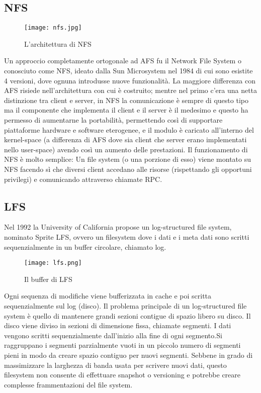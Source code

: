 \subsection{NFS}
\begin{figure}[ht]
  \begin{center}
    \texttt{[image: nfs.jpg]}
    \caption{L'architettura di NFS}
    \label{nfs}
  \end{center}
\end{figure}
Un approccio completamente ortogonale ad AFS fu il Network File System o conosciuto come NFS, ideato dalla Sun Microsystem nel 1984 di cui sono esistite 4 versioni, dove ognuna introdusse nuove funzionalità. La maggiore differenza con AFS risiede nell'architettura con cui è costruito; mentre nel primo c'era una netta distinzione tra client e server, in NFS la comunicazione è sempre di questo tipo ma il componente che implementa il client e il server è il medesimo e questo ha permesso di aumentarne la portabilità, permettendo così di supportare piattaforme hardware e software eterogenee, e il modulo è caricato all'interno del kernel-space (a differenza di AFS dove sia client che server erano implementati nello user-space) avendo così un aumento delle prestazioni. Il funzionamento di NFS è molto semplice: Un file system (o una porzione di esso) viene montato su NFS facendo sì che diversi client accedano alle risorse (rispettando gli opportuni privilegi) e comunicando attraverso chiamate RPC.
\subsection{LFS}
Nel 1992 la University of California propose un log-structured file system, nominato Sprite LFS, ovvero un filesystem dove i dati e i meta dati sono scritti sequenzialmente in un buffer circolare, chiamato log.\cite{rosenblum92} \\
\begin{figure}[ht]
  \begin{center}
    \texttt{[image: lfs.png]}
    \caption{Il buffer di LFS}
    \label{lfs}
  \end{center}
\end{figure}
Ogni sequenza di modifiche viene bufferizzata in cache e poi scritta sequenzialmente sul log (disco). Il problema principale di un log-structured file system è quello di mantenere grandi sezioni contigue di spazio libero su disco. Il disco viene diviso in sezioni di dimensione fissa, chiamate segmenti. I dati vengono scritti sequenzialmente dall'inizio alla fine di ogni segmento.Si raggruppano i segmenti parzialmente vuoti in un piccolo numero di segmenti pieni in modo da creare spazio contiguo per nuovi segmenti. Sebbene in grado di massimizzare la larghezza di banda usata per scrivere nuovi dati, questo filesystem non consente di effettuare snapshot o versioning e potrebbe creare complesse frammentazioni del file system.
